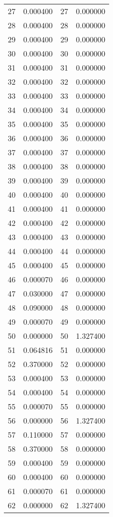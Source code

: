 \documentclass[12pt]{article}
\begin{document}
\begin{longtable}{@{}cccc@{}}
27 & 0.000400 & 27 & 0.000000 \\
28 & 0.000400 & 28 & 0.000000 \\
29 & 0.000400 & 29 & 0.000000 \\
30 & 0.000400 & 30 & 0.000000 \\
31 & 0.000400 & 31 & 0.000000 \\
32 & 0.000400 & 32 & 0.000000 \\
33 & 0.000400 & 33 & 0.000000 \\
34 & 0.000400 & 34 & 0.000000 \\
35 & 0.000400 & 35 & 0.000000 \\
36 & 0.000400 & 36 & 0.000000 \\
37 & 0.000400 & 37 & 0.000000 \\
38 & 0.000400 & 38 & 0.000000 \\
39 & 0.000400 & 39 & 0.000000 \\
40 & 0.000400 & 40 & 0.000000 \\
41 & 0.000400 & 41 & 0.000000 \\
42 & 0.000400 & 42 & 0.000000 \\
43 & 0.000400 & 43 & 0.000000 \\
44 & 0.000400 & 44 & 0.000000 \\
45 & 0.000400 & 45 & 0.000000 \\
46 & 0.000070 & 46 & 0.000000 \\
47 & 0.030000 & 47 & 0.000000 \\
48 & 0.090000 & 48 & 0.000000 \\
49 & 0.000070 & 49 & 0.000000 \\
50 & 0.000000 & 50 & 1.327400 \\
51 & 0.064816 & 51 & 0.000000 \\
52 & 0.370000 & 52 & 0.000000 \\
53 & 0.000400 & 53 & 0.000000 \\
54 & 0.000400 & 54 & 0.000000 \\
55 & 0.000070 & 55 & 0.000000 \\
56 & 0.000000 & 56 & 1.327400 \\
57 & 0.110000 & 57 & 0.000000 \\
58 & 0.370000 & 58 & 0.000000 \\
59 & 0.000400 & 59 & 0.000000 \\
60 & 0.000400 & 60 & 0.000000 \\
61 & 0.000070 & 61 & 0.000000 \\
62 & 0.000000 & 62 & 1.327400 \\

\end{longtable}
\end{document}
